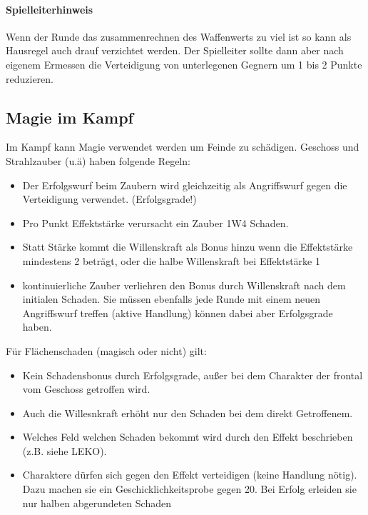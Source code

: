 \documentclass{article}
\begin{document}
\begin{mdframed}[hidealllines=true, backgroundcolor=black!10]
\paragraph{Spielleiterhinweis}

Wenn der Runde das zusammenrechnen des Waffenwerts zu viel ist so kann als Hausregel auch drauf verzichtet werden.
Der Spielleiter sollte dann aber nach eigenem Ermessen die Verteidigung von unterlegenen Gegnern um 1 bis 2 Punkte
reduzieren.

\end{mdframed}
\begin{center}
\subsection{Magie im Kampf}
\end{center}

Im Kampf kann Magie verwendet werden um Feinde zu schädigen. Geschoss und Strahlzauber (u.ä) haben folgende Regeln:

\begin{itemize}
\item Der Erfolgswurf beim Zaubern wird gleichzeitig als Angriffswurf gegen die Verteidigung verwendet. (Erfolgsgrade!)
\item Pro Punkt Effektstärke verursacht ein Zauber 1W4 Schaden.
\item Statt Stärke kommt die Willenskraft als Bonus hinzu wenn die Effektstärke mindestens 2 beträgt, oder die halbe Willenskraft bei Effektstärke 1
\item kontinuierliche Zauber verliehren den Bonus durch Willenskraft nach dem initialen Schaden. Sie müssen ebenfalls jede Runde mit einem neuen Angriffswurf treffen (aktive Handlung) können dabei aber Erfolgsgrade haben.
\end{itemize}

Für Flächenschaden (magisch oder nicht) gilt:

\begin{itemize}
\item Kein Schadensbonus durch Erfolgsgrade, außer bei dem Charakter der frontal vom Geschoss getroffen wird.
\item Auch die Willesnkraft erhöht nur den Schaden bei dem direkt Getroffenem.
\item Welches Feld welchen Schaden bekommt wird durch den Effekt beschrieben (z.B. siehe LEKO).
\item Charaktere dürfen sich gegen den Effekt verteidigen (keine Handlung nötig). Dazu machen sie ein Geschicklichkeitsprobe gegen 20. Bei Erfolg erleiden sie nur halben abgerundeten Schaden
\end{itemize}
\end{document}
